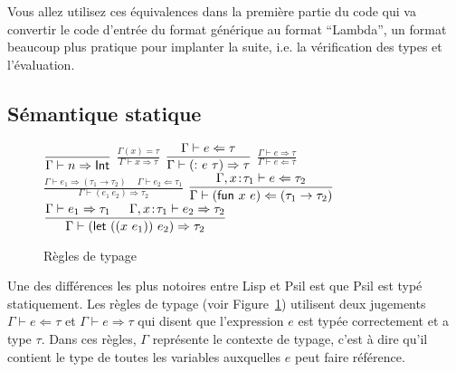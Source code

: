 \documentclass{article}
\begin{document}
Vous allez utilisez ces équivalences dans la première partie du code qui va
convertir le code d'entrée du format générique  au format
``Lambda'', un format beaucoup plus pratique pour implanter la suite,
i.e. la vérification des types et l'évaluation.

\subsection{Sémantique statique}

\newcommand \CheckKind [1] {\vdash #1}
\newcommand \CheckType [2][\Gamma] {#1 \vdash #2 \Leftarrow }
\newcommand \InferType [2][\Gamma] {#1 \vdash #2 \Rightarrow }
\newcommand \BothType [2][\Gamma] {#1 \vdash #2 ~:~}
\newcommand \Axiom [2] { \mbox{}\hspace{10pt}\nolinebreak\ensuremath{\displaystyle
    \frac{#1}{#2}}\nolinebreak\hspace{10pt}\mbox{} \medskip}
\newcommand \HA {\hspace{15pt}}
\renewcommand \: {\!:\!}

\begin{figure}
  \begin{minipage}{\columnwidth}
    \noindent \centering

    \Axiom{}{\InferType{n}{\kw{Int}}}
    \Axiom{\Gamma(x) = \tau}{\InferType{x}{\tau}}
    \Axiom{\CheckType{e}{\tau}}
          {\InferType{(\kw{:}~e~\tau)}{\tau}}
    \Axiom{\InferType{e}{\tau}}
          {\CheckType{e}{\tau}}
    \Axiom{\InferType{e_1}{(\tau_1\to\tau_2)}
           \HA
           \CheckType{e_2}{\tau_1}}
          {\InferType{(e_1~e_2)}{\tau_2}}
    \Axiom{\CheckType[\Gamma,x\:\tau_1]{e}{\tau_2}}
          {\CheckType{(\kw{fun}~x~e)}{(\tau_1\to\tau_2)}}
    \Axiom{\InferType{e_1}{\tau_1} \HA \InferType[\Gamma,x\:\tau_1]{e_2}{\tau_2}}
          {\InferType{(\kw{let}~((x~e_1))~e_2)}{\tau_2}}
    \mbox{}
  \end{minipage}
  \caption{Règles de typage}
  \label{fig:typing}
\end{figure}

Une des différences les plus notoires entre Lisp et Psil est que Psil est
typé statiquement.  Les règles de typage (voir Figure~\ref{fig:typing})
utilisent deux jugements $\CheckType{e}{\tau}$ et $\InferType{e}{\tau}$ qui
disent que l'expression $e$ est typée correctement et a type $\tau$.  Dans ces
règles, $\Gamma$ représente le contexte de typage, c'est à dire qu'il contient le
type de toutes les variables auxquelles $e$ peut faire référence.
\end{document}
